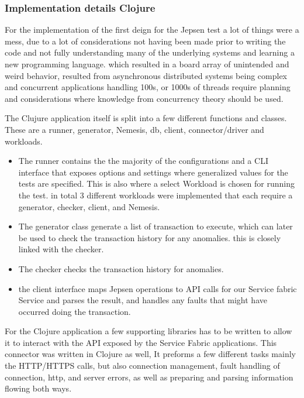 \documentclass[a4paper,10pt,titlepage]{report}
\begin{document}
    \subsubsection{Implementation details Clojure}
        For the implementation of the first deign for the Jepsen test a lot of things were a mess, due to a lot of considerations not having been made prior to writing the code and not fully understanding many of the underlying systems and learning a new programming language. which resulted in a board array of unintended and weird behavior, resulted from asynchronous distributed systems being complex and concurrent applications handling 100s, or 1000s of threads require planning and considerations where knowledge from concurrency theory should be used. 
        
        
        The Clujure application itself is split into a few different functions and classes. These are a runner, generator, Nemesis, db, client, connector/driver and workloads.
        \begin{itemize}
            \item         The runner contains the the majority of the configurations and a CLI interface that exposes options and settings where generalized values for the tests are specified. This is also where a select Workload is chosen for running the test. in total 3 different workloads were implemented that each require a generator, checker, client, and Nemesis.
        
        \item  The generator class generate a list of transaction to execute, which can later be used to check the transaction history for any anomalies. this is closely linked with the checker.
        
        \item  The checker checks the transaction history for anomalies.
        
        \item  the client interface maps Jepsen operations to API calls for our Service fabric Service and parses the result, and handles any faults that might have occurred doing the transaction.
        \end{itemize}
        
        
        For the Clojure application a few supporting libraries has to be written to allow it to interact with the API exposed by the Service Fabric applications. This connector was written in Clojure as well, It preforms a few different tasks mainly the HTTP/HTTPS calls, but also connection management, fault handling of connection, http, and server errors, as well as preparing and parsing information flowing both ways.
        
\end{document}
